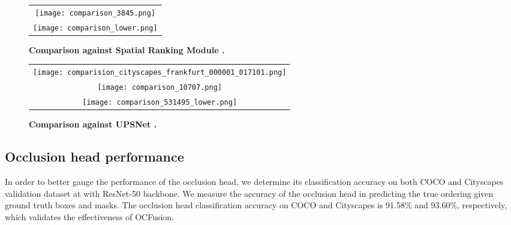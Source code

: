 \documentclass[10pt,twocolumn,letterpaper]{article}
\begin{document}
\begin{figure*}[!htp]
\vspace{-0mm}
\begin{center}
\begin{tabular} {c}
\hspace{-5mm} \texttt{[image: comparison\_3845.png]} \\
\hspace{-5mm} \texttt{[image: comparison\_lower.png]}
\end{tabular}
\end{center}
\vspace{-6mm}
\caption{\textbf{Comparison against Spatial Ranking Module \cite{liu2019end}.}}
\vspace{5mm}
\label{fig:figure_ComparisonEndToEnd}
\end{figure*}

\begin{figure*}[!h]

\vspace{0mm}
\begin{center}
\begin{tabular} {c}
\hspace{-5mm} \texttt{[image: comparision\_cityscapes\_frankfurt\_000001\_017101.png]} \\
\hspace{-5mm} \texttt{[image: comparison\_10707.png]} \\
\hspace{-5mm} \texttt{[image: comparison\_531495\_lower.png]}
\end{tabular}
\end{center}
\vspace{-6mm}
\caption{\textbf{Comparison against UPSNet \cite{xiong2019upsnet}.}}
\vspace{0mm}
\label{fig:figure_ComparisonUPSNet}
\end{figure*}


\subsection{Occlusion head performance}
In order to better gauge the performance of the occlusion head, we determine its classification accuracy on both COCO and Cityscapes validation dataset at  with ResNet-50 backbone. We measure the accuracy of the occlusion head in predicting the true ordering given ground truth boxes and masks. The occlusion head classification accuracy on COCO and Cityscapes is 91.58\% and 93.60\%, respectively, which validates the effectiveness of OCFusion.
\end{document}
